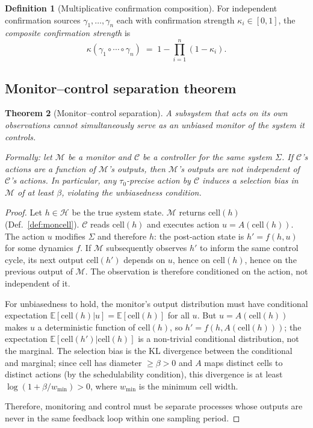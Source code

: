 \documentclass[11pt,twocolumn,a4paper]{article}
\theoremstyle{plain}
\newtheorem{theorem}{Theorem}[section]
\theoremstyle{definition}
\newtheorem{definition}[theorem]{Definition}
\theoremstyle{remark}
\renewcommand{\H}{\mathcal{H}}
\newcommand{\tick}{\tau_0}
\newcommand{\floor}{\beta}
\newcommand{\cell}{\mathrm{cell}}
\newcommand{\kap}{\kappa}
\begin{document}
\begin{definition}[Multiplicative confirmation composition]
\label{def:multconf}
For independent confirmation sources $\gamma_1, \ldots, \gamma_n$ each with confirmation strength $\kap_i \in [0,1]$, the \emph{composite confirmation strength} is
\[
  \kap(\gamma_1 \circ \cdots \circ \gamma_n) \;=\; 1 - \prod_{i=1}^n (1 - \kap_i).
\]
\end{definition}

\subsection{Monitor--control separation theorem}

\begin{theorem}[Monitor--control separation]
\label{thm:separation}
A subsystem that acts on its own observations cannot simultaneously serve as an unbiased monitor of the system it controls.

Formally: let $\mathcal{M}$ be a monitor and $\mathcal{C}$ be a controller for the same system $\Sigma$. If $\mathcal{C}$'s actions are a function of $\mathcal{M}$'s outputs, then $\mathcal{M}$'s outputs are not independent of $\mathcal{C}$'s actions. In particular, any $\tick$-precise action by $\mathcal{C}$ induces a selection bias in $\mathcal{M}$ of at least $\floor$, violating the unbiasedness condition.
\end{theorem}

\begin{proof}
Let $h \in \H$ be the true system state. $\mathcal{M}$ returns $\cell(h)$ (Def.~\ref{def:moncell}). $\mathcal{C}$ reads $\cell(h)$ and executes action $u = A(\cell(h))$. The action $u$ modifies $\Sigma$ and therefore $h$: the post-action state is $h' = f(h, u)$ for some dynamics $f$. If $\mathcal{M}$ subsequently observes $h'$ to inform the same control cycle, its next output $\cell(h')$ depends on $u$, hence on $\cell(h)$, hence on the previous output of $\mathcal{M}$. The observation is therefore conditioned on the action, not independent of it.

For unbiasedness to hold, the monitor's output distribution must have conditional expectation $\mathbb{E}[\cell(h) | u] = \mathbb{E}[\cell(h)]$ for all $u$. But $u = A(\cell(h))$ makes $u$ a deterministic function of $\cell(h)$, so $h' = f(h, A(\cell(h)))$; the expectation $\mathbb{E}[\cell(h') | \cell(h)]$ is a non-trivial conditional distribution, not the marginal. The selection bias is the KL divergence between the conditional and marginal; since $\cell$ has diameter $\geq \floor > 0$ and $A$ maps distinct cells to distinct actions (by the schedulability condition), this divergence is at least $\log(1 + \floor / w_{\min}) > 0$, where $w_{\min}$ is the minimum cell width.

Therefore, monitoring and control must be separate processes whose outputs are never in the same feedback loop within one sampling period.
\end{proof}
\end{document}
